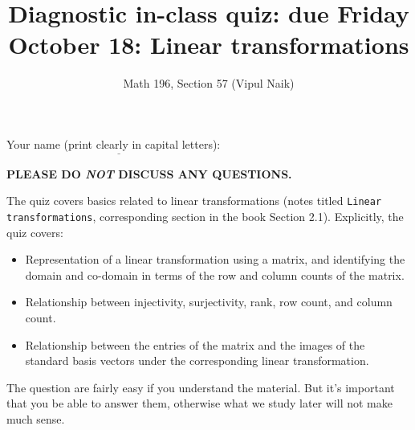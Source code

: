 \documentclass[10pt]{amsart}
\title{Diagnostic in-class quiz: due Friday October 18: Linear transformations}
\author{Math 196, Section 57 (Vipul Naik)}
\begin{document}
\maketitle

Your name (print clearly in capital letters): $\underline{\qquad\qquad\qquad\qquad\qquad\qquad\qquad\qquad\qquad\qquad}$

{\bf PLEASE DO {\em NOT} DISCUSS ANY QUESTIONS.}

The quiz covers basics related to linear transformations (notes titled
{\tt Linear transformations}, corresponding section in the book
Section 2.1). Explicitly, the quiz covers:

\begin{itemize}
\item Representation of a linear transformation using a matrix, and
  identifying the domain and co-domain in terms of the row and column
  counts of the matrix.
\item Relationship between injectivity, surjectivity, rank, row count,
  and column count.
\item Relationship between the entries of the matrix and the images of
  the standard basis vectors under the corresponding linear
  transformation.
\end{itemize}

The question are fairly easy if you understand the material. But it's
important that you be able to answer them, otherwise what we study
later will not make much sense.
\end{document}
